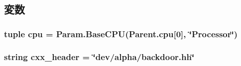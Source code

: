 \subsection{変数}
\hypertarget{classAlphaBackdoor_1_1AlphaBackdoor_a41feb23725c8f280bd96697cc0be1836}{
\subsubsection[{cpu}]{\setlength{\rightskip}{0pt plus 5cm}tuple {\bf cpu} = Param.BaseCPU(Parent.cpu\mbox{[}0\mbox{]}, \char`\"{}Processor\char`\"{})}}
\label{classAlphaBackdoor_1_1AlphaBackdoor_a41feb23725c8f280bd96697cc0be1836}
\hypertarget{classAlphaBackdoor_1_1AlphaBackdoor_a17da7064bc5c518791f0c891eff05fda}{
\subsubsection[{cxx\_\-header}]{\setlength{\rightskip}{0pt plus 5cm}string cxx\_\-header = \char`\"{}dev/alpha/backdoor.hh\char`\"{}}}
\label{classAlphaBackdoor_1_1AlphaBackdoor_a17da7064bc5c518791f0c891eff05fda}



